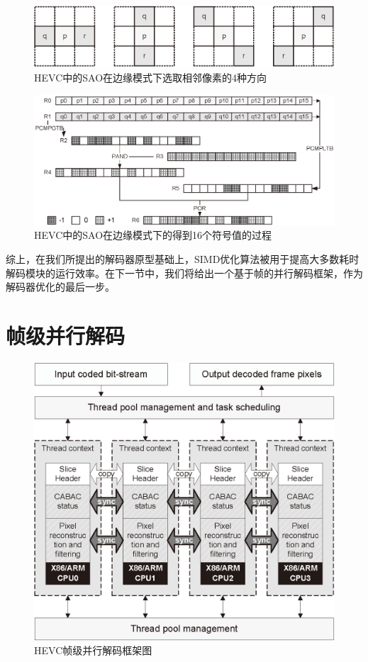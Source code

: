\begin{figure}[!tp]
	\centering
	\includegraphics[width = 0.9\linewidth]{eps/SAO_edge_direction}
	\caption{\label{fig:SAO_edge_direction}HEVC中的SAO在边缘模式下选取相邻像素的4种方向}
\end{figure}

\begin{figure}[!tp]
	\centering
	\includegraphics[width = 0.95\linewidth]{eps/SAO_edge_parallel_index}
	\caption{\label{fig:SAO_edge_parallel_index}HEVC中的SAO在边缘模式下的得到16个符号值的过程}
\end{figure}

综上，在我们所提出的解码器原型基础上，SIMD优化算法被用于提高大多数耗时解码模块的运行效率。在下一节中，我们将给出一个基于帧的并行解码框架，作为解码器优化的最后一步。

\section{帧级并行解码}

\begin{figure}[!tp]
	\centering
	\includegraphics[width = 0.8\linewidth]{eps/parallel_decoding_framework}
	\caption{\label{fig:parallel_decoding_framework}HEVC帧级并行解码框架图}
\end{figure}

